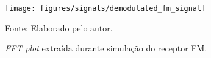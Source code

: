 \documentclass[
  12pt,				%
  openright,			%
  twoside,			%
  a4paper,			%
  english,			%
  french,				%
  spanish,			%
  brazil,				%
  ]{abntex2}
\begin{document}
\begin{figure}[!htb]
  \centering
  \caption{\textit{FFT plot} extraída durante simulação do receptor FM.}
  \texttt{[image: figures/signals/demodulated\_fm\_signal]}
  \label{fig:gnuradio_demodulated_fm_signal}

  Fonte: Elaborado pelo autor.
\end{figure}


















\end{document}
